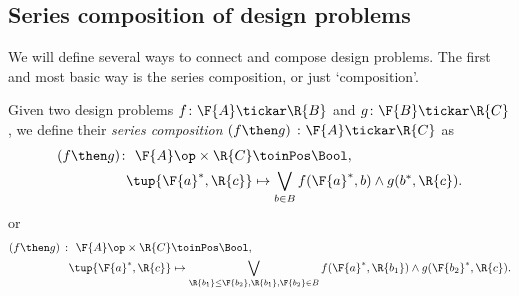 %
%
%


\subsection{Series composition of design problems}

We will define several ways to connect and compose design problems. The first and most basic way is the series composition, or just `composition'.

\begin{definition}
\label{def:dp-series}
Given two design problems $f \colon  \F{A} \tickar \R{B}$ and $g \colon \F{B} \tickar \R{C}$, we define their \emph{series composition}
$(f\then g)\ \colon  \F{A} \tickar \R{C}$
as
\begin{equation}
\label{eq:composition2}
\begin{aligned}
   (f \then g)  \colon \ \F{A}\op \times \R{C} & \toinPos  \Bool, \\
  \tup{\F{a}^*, \R{c}} &\mapsto \bigvee_{b\in B} f(\F{a}^*,b) \wedge g(b^*,\R{c}).
\end{aligned}
\end{equation}
or
\begin{equation}
\begin{aligned}
\label{eq:composition}
   (f \then g)\  \colon \ \F{A}\op \times \R{C} & \toinPos  \Bool,  \\
  \tup{\F{a}^*, \R{c}} &\mapsto \bigvee_{\R{b_1}\leq\F{b_2}, \R{b_1},\F{b_2}\in B} f(\F{a}^*,\R{b_1}) \wedge g(\F{b_2}^*,\R{c}).
\end{aligned}
\end{equation}
\end{definition}

